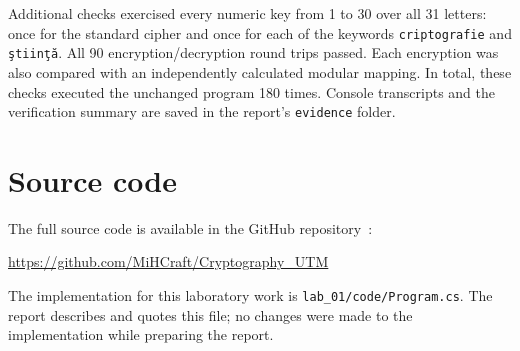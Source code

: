 \documentclass{tum_report}
\begin{document}
Additional checks exercised every numeric key from 1 to 30 over all 31
letters: once for the standard cipher and once for each of the keywords
\texttt{criptografie} and \texttt{ştiinţă}. All 90 encryption/decryption
round trips passed. Each encryption was also compared with an independently
calculated modular mapping. In total, these checks executed the unchanged
program 180 times. Console transcripts and the verification summary are
saved in the report's \texttt{evidence} folder.

\clearpage

\section{Source code}
The full source code is available in the GitHub repository~\cite{ref:source}:
\begin{center}
\url{https://github.com/MiHCraft/Cryptography_UTM}
\end{center}
The implementation for this laboratory work is
\texttt{lab\_01/code/Program.cs}. The report describes and quotes this file;
no changes were made to the implementation while preparing the report.

\clearpage
{}
{}

\end{document}
